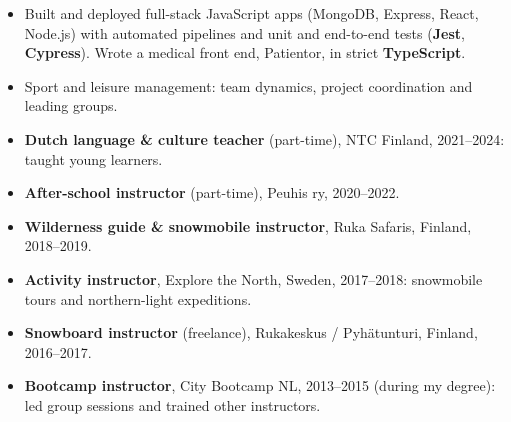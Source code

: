 \documentclass[10pt,a4paper,ragged2e,withhyper]{altacv}
\begin{document}
\begin{itemize}
  \item Built and deployed full-stack JavaScript apps (MongoDB, Express, React, Node.js) with automated pipelines
        and unit and end-to-end tests (\textbf{Jest}, \textbf{Cypress}). Wrote a medical front end, Patientor, in strict \textbf{TypeScript}.
\end{itemize}

\divider

\begin{itemize}
  \item Sport and leisure management: team dynamics, project coordination and leading groups.
\end{itemize}

\begin{itemize}
  \item \textbf{Dutch language \& culture teacher} (part-time), NTC Finland, 2021--2024: taught young learners.
  \item \textbf{After-school instructor} (part-time), Peuhis ry, 2020--2022.
  \item \textbf{Wilderness guide \& snowmobile instructor}, Ruka Safaris, Finland, 2018--2019.
  \item \textbf{Activity instructor}, Explore the North, Sweden, 2017--2018: snowmobile tours and northern-light expeditions.
  \item \textbf{Snowboard instructor} (freelance), Rukakeskus / Pyhätunturi, Finland, 2016--2017.
  \item \textbf{Bootcamp instructor}, City Bootcamp NL, 2013--2015 (during my degree): led group sessions and trained other instructors.
\end{itemize}
\end{document}
